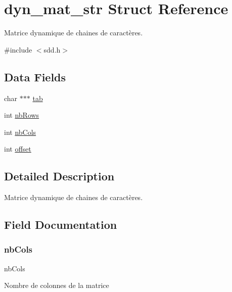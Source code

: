 \hypertarget{structdyn__mat__str}{}\section{dyn\+\_\+mat\+\_\+str Struct Reference}
\label{structdyn__mat__str}


Matrice dynamique de chaines de caractères.  




{\ttfamily \#include $<$sdd.\+h$>$}

\subsection*{Data Fields}
\begin{DoxyCompactItemize}
\item 
char $\ast$$\ast$$\ast$ \hyperlink{structdyn__mat__str_af1ffd7c07d3cf727dfbec1ee327606fa}{tab}
\item 
int \hyperlink{structdyn__mat__str_a5d6e5f472f35cd5d4ef033b514c48861}{nb\+Rows}
\item 
int \hyperlink{structdyn__mat__str_ac54d0ebc8f0c91c94d6df9e5cf477441}{nb\+Cols}
\item 
int \hyperlink{structdyn__mat__str_a7a229a4786deeddd59c6091247a8c8a6}{offset}
\end{DoxyCompactItemize}


\subsection{Detailed Description}
Matrice dynamique de chaines de caractères. 

\subsection{Field Documentation}
\mbox{\label{structdyn__mat__str_ac54d0ebc8f0c91c94d6df9e5cf477441}} 
\subsubsection{\texorpdfstring{nb\+Cols}{nbCols}}
{\footnotesize\ttfamily nb\+Cols}

Nombre de colonnes de la matrice \mbox{\label{structdyn__mat__str_a5d6e5f472f35cd5d4ef033b514c48861}} 
